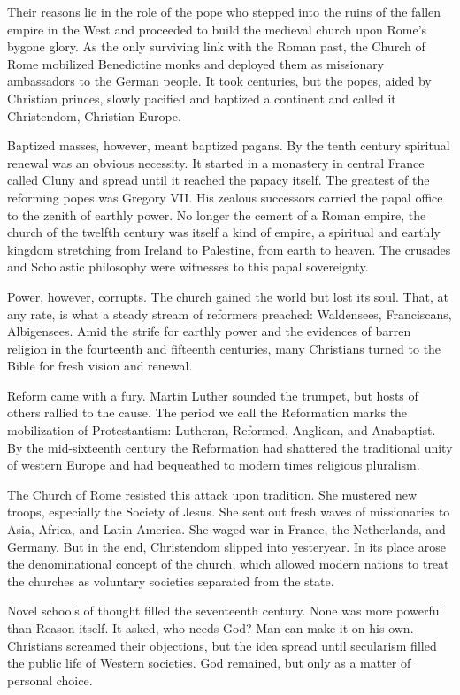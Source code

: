 Their reasons lie in the role of the pope who stepped into the ruins of the fallen empire in the
West and proceeded to build the medieval church upon Rome’s bygone glory. As the only surviving link
with the Roman past, the Church of Rome mobilized Benedictine monks and deployed them as missionary
ambassadors to the German people. It took centuries, but the popes, aided by Christian princes,
slowly pacified and baptized a continent and called it Christendom, Christian Europe.

Baptized masses, however, meant baptized pagans. By the tenth century spiritual renewal was an
obvious necessity. It started in a monastery in central France called Cluny and spread until it
reached the papacy itself. The greatest of the reforming popes was Gregory VII. His zealous
successors carried the papal office to the zenith of earthly power. No longer the cement of a Roman
empire, the church of the twelfth century was itself a kind of empire, a spiritual and earthly
kingdom stretching from Ireland to Palestine, from earth to heaven. The crusades and Scholastic
philosophy were witnesses to this papal sovereignty.

Power, however, corrupts. The church gained the world but lost its soul. That, at any rate, is what
a steady stream of reformers preached: Waldensees, Franciscans, Albigensees. Amid the strife for
earthly power and the evidences of barren religion in the fourteenth and fifteenth centuries, many
Christians turned to the Bible for fresh vision and renewal.

Reform came with a fury. Martin Luther sounded the trumpet, but hosts of others rallied to the
cause. The period we call the Reformation marks the mobilization of Protestantism: Lutheran,
Reformed, Anglican, and Anabaptist. By the mid-sixteenth century the Reformation had shattered the
traditional unity of western Europe and had bequeathed to modern times religious pluralism.

The Church of Rome resisted this attack upon tradition. She mustered new troops, especially the
Society of Jesus. She sent out fresh waves of missionaries to Asia, Africa, and Latin America. She
waged war in France, the Netherlands, and Germany. But in the end, Christendom slipped into
yesteryear. In its place arose the denominational concept of the church, which allowed modern
nations to treat the churches as voluntary societies separated from the state.

Novel schools of thought filled the seventeenth century. None was more powerful than Reason itself.
It asked, who needs God? Man can make it on his own. Christians screamed their objections, but the
idea spread until secularism filled the public life of Western societies. God remained, but only as
a matter of personal choice.


